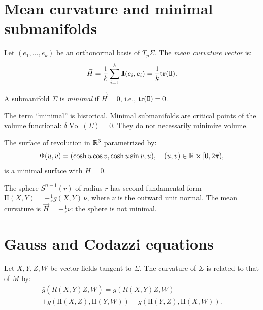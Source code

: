 \section{Mean curvature and minimal submanifolds}

\begin{definition}
Let $(e_1, \ldots, e_k)$ be an orthonormal basis of $T_p\Sigma$. The \emph{mean
curvature vector} is:
\[
    \vec{H} = \frac{1}{k} \sum_{i=1}^{k} \mathrm{I\!I}(e_i, e_i)
    = \frac{1}{k} \mathrm{tr}(\mathrm{I\!I}).
\]
\end{definition}

\begin{definition}
A submanifold $\Sigma$ is \emph{minimal} if $\vec{H} = 0$, i.e., $\mathrm{tr}(\mathrm{I\!I}) = 0$.
\end{definition}

\begin{remark}
The term ``minimal'' is historical. Minimal submanifolds are critical points of
the volume functional: $\delta \operatorname{Vol}(\Sigma) = 0$. They do not
necessarily minimize volume.
\end{remark}

\begin{example}[Catenoid]
The surface of revolution in $\mathbb{R}^3$ parametrized by:
\[
    \Phi(u, v) = (\cosh u \cos v, \cosh u \sin v, u), \quad (u, v) \in \mathbb{R} \times [0, 2\pi),
\]
is a minimal surface with $H = 0$.
\end{example}

\begin{example}
The sphere $S^{n-1}(r)$ of radius $r$ has second fundamental form
$\mathrm{I\!I}(X, Y) = -\frac{1}{r} g(X, Y)\, \nu$, where $\nu$ is the outward
unit normal. The mean curvature is $\vec{H} = -\frac{1}{r}\nu$: the sphere is
not minimal.
\end{example}

\section{Gauss and Codazzi equations}

\begin{theorem}
\label{thm:gauss}
Let $X, Y, Z, W$ be vector fields tangent to $\Sigma$. The curvature of $\Sigma$
is related to that of $M$ by:
\begin{multline*}
    \bar{g}(\bar{R}(X, Y)Z, W) = g(R(X, Y)Z, W) \\
    + g(\mathrm{I\!I}(X, Z), \mathrm{I\!I}(Y, W))
    - g(\mathrm{I\!I}(Y, Z), \mathrm{I\!I}(X, W)).
\end{multline*}
\end{theorem}

